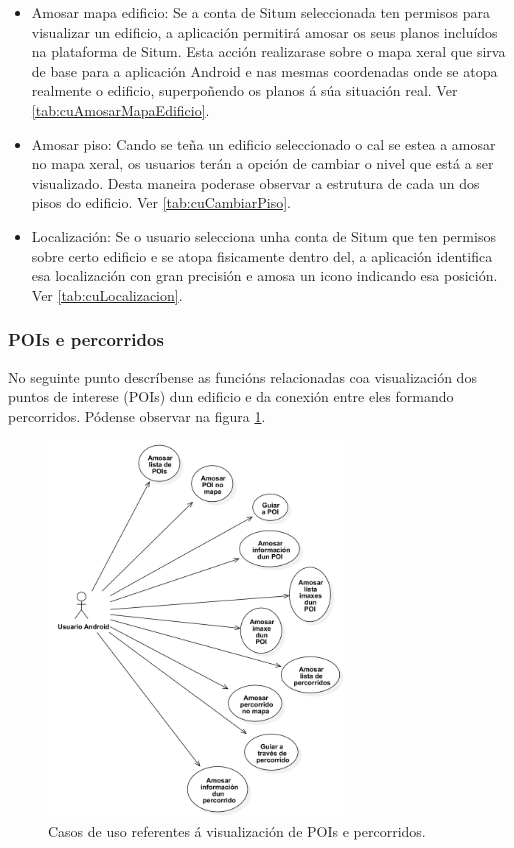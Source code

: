 \begin{itemize}
	\item Amosar mapa edificio: Se a conta de Situm seleccionada ten permisos para visualizar un edificio, a aplicación permitirá amosar os seus planos incluídos na plataforma de Situm. Esta acción realizarase sobre o mapa xeral que sirva de base para a aplicación Android e nas mesmas coordenadas onde se atopa realmente o edificio, superpoñendo os planos á súa situación real. Ver \ref{tab:cuAmosarMapaEdificio}.
	\item Amosar piso: Cando se teña un edificio seleccionado o cal se estea a amosar no mapa xeral, os usuarios terán a opción de cambiar o nivel que está a ser visualizado. Desta maneira poderase observar a estrutura de cada un dos pisos do edificio. Ver \ref{tab:cuCambiarPiso}.
	\item Localización: Se o usuario selecciona unha conta de Situm que ten permisos sobre certo edificio e se atopa fisicamente dentro del, a aplicación identifica esa localización con gran precisión e amosa un icono indicando esa posición. Ver \ref{tab:cuLocalizacion}.
\end{itemize}


\subsubsection{POIs e percorridos}
No seguinte punto descríbense as funcións relacionadas coa visualización dos puntos de interese (POIs) dun edificio e da conexión entre eles formando percorridos. Pódense observar na figura \ref{fig:cuUsuarioAndroidPrincipalPOIPercorrido}.

\begin{figure}[tbh]
	\begin{center}
		\includegraphics[width=0.7\textwidth]{figures/CasosUso/UsuarioAndroidPOIPercorrido}
		\caption{Casos de uso referentes á visualización de POIs e percorridos.}
		\label{fig:cuUsuarioAndroidPrincipalPOIPercorrido}
	\end{center}
\end{figure}

